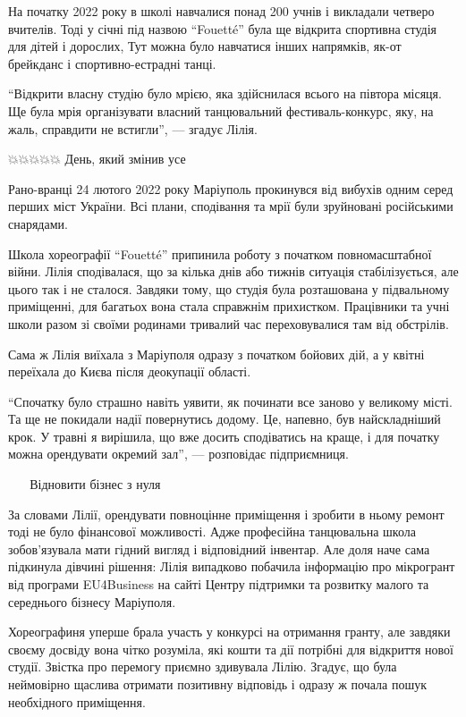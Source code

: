 На початку 2022 року в школі навчалися понад 200 учнів і викладали четверо
вчителів. Тоді у січні під назвою \enquote{Fouetté} була ще відкрита спортивна студія
для дітей і дорослих, Тут можна було навчатися інших напрямків, як-от брейкданс
і спортивно-естрадні танці.

\enquote{Відкрити власну студію було мрією, яка здійснилася всього на півтора місяця.
Ще була мрія організувати власний танцювальний фестиваль-конкурс, яку, на жаль,
справдити не встигли}, — згадує Лілія.

💥💥💥💥💥 День, який змінив усе

Рано-вранці 24 лютого 2022 року Маріуполь прокинувся від вибухів одним серед
перших міст України. Всі плани, сподівання та мрії були зруйновані російськими
снарядами.

Школа хореографії \enquote{Fouetté} припинила роботу з початком повномасштабної війни.
Лілія сподівалася, що за кілька днів або тижнів ситуація стабілізується, але
цього так і не сталося. Завдяки тому, що студія була розташована у підвальному
приміщенні, для багатьох вона стала справжнім прихистком. Працівники та учні
школи разом зі своїми родинами тривалий час переховувалися там від обстрілів. 

Сама ж Лілія виїхала з Маріуполя одразу з початком бойових дій, а у квітні
переїхала до Києва після деокупації області.

\enquote{Спочатку було страшно навіть уявити, як починати все заново у великому місті.
Та ще не покидали надії повернутись додому. Це, напевно, був найскладніший
крок. У травні я вирішила, що вже досить сподіватись на краще, і для початку
можна орендувати окремий зал}, — розповідає підприємниця.

👣👣👣👣👣 Відновити бізнес з нуля

За словами Лілії, орендувати повноцінне приміщення і зробити в ньому ремонт
тоді не було фінансової можливості. Адже професійна танцювальна школа
зобов'язувала мати гідний вигляд і відповідний інвентар. Але доля наче сама
підкинула дівчині рішення: Лілія випадково побачила інформацію про мікрогрант
від програми EU4Business на сайті Центру підтримки та розвитку малого та
середнього бізнесу Маріуполя.

Хореографиня уперше брала участь у конкурсі на отримання гранту, але завдяки
своєму досвіду вона чітко розуміла, які кошти та дії потрібні для відкриття
нової студії. Звістка про перемогу приємно здивувала Лілію. Згадує, що була
неймовірно щаслива отримати позитивну відповідь і одразу ж почала пошук
необхідного приміщення.

